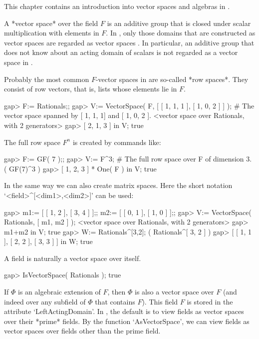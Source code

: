 
This chapter contains an introduction into vector spaces and
algebras in {\GAP}.


A *vector space* over the field $F$ is an additive group that is closed
under scalar multiplication with elements in $F$.
In {\GAP}, only those domains that are
constructed as vector spaces are regarded as vector spaces .
In particular, an additive group that does not know about an
acting domain of scalars is not regarded as a vector space in {\GAP}.

Probably the most common $F$-vector spaces in {\GAP} are so-called
*row spaces*.
They consist of row vectors, that is, lists whose elements lie in $F$.

\beginexample
gap> F:= Rationals;;
gap> V:= VectorSpace( F, [ [ 1, 1, 1 ], [ 1, 0, 2 ] ] );
# The vector space spanned by [ 1, 1, 1] and [ 1, 0, 2 ].
<vector space over Rationals, with 2 generators>
gap> [ 2, 1, 3 ] in V;
true
\endexample

The full row space $F^n$ is created by commands like:

\beginexample
gap> F:= GF( 7 );;
gap> V:= F^3;                                           
# The full row space over F of dimension 3. 
( GF(7)^3 )
gap> [ 1, 2, 3 ] * One( F ) in V;  
true
\endexample

In the same way we can also create matrix spaces. Here the short notation
`<field>^[<dim1>,<dim2>]' can be used:

\beginexample
gap> m1:= [ [ 1, 2 ], [ 3, 4 ] ];; m2:= [ [ 0, 1 ], [ 1, 0 ] ];;
gap> V:= VectorSpace( Rationals, [ m1, m2 ] );
<vector space over Rationals, with 2 generators>
gap> m1+m2 in V;
true
gap> W:= Rationals^[3,2];
( Rationals^[ 3, 2 ] )
gap> [ [ 1, 1 ], [ 2, 2 ], [ 3, 3 ] ] in W;
true
\endexample

A field is naturally a vector space over itself. 

\beginexample
gap> IsVectorSpace( Rationals );
true
\endexample

If $\Phi$ is an algebraic extension of $F$, then $\Phi$ is
also a vector space over $F$ (and indeed over any subfield of $\Phi$
that contains $F$). This field $F$ is stored in the attribute
`LeftActingDomain'.
In {\GAP}, the default is to view fields as vector spaces
over their *prime* fields.
By the function `AsVectorSpace', we can view fields
as vector spaces over fields other than the prime field.

